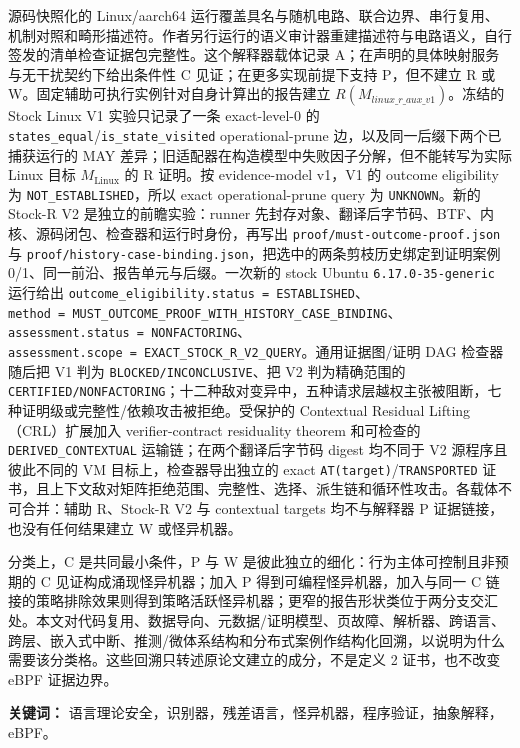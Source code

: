 \documentclass[
  11pt,
  a4paper,
]{ctexart}
\begin{document}
源码快照化的 Linux/aarch64
运行覆盖具名与随机电路、联合边界、串行复用、机制对照和畸形描述符。作者另行运行的语义审计器重建描述符与电路语义，自行签发的清单检查证据包完整性。这个解释器载体记录
A；在声明的具体映射服务与无干扰契约下给出条件性 C
见证；在更多实现前提下支持 P，但不建立 R 或
W。固定辅助可执行实例针对自身计算出的报告建立
\(R(M_{\mathit{linux\_r\_aux\_v1}})\)。冻结的 Stock Linux V1
实验只记录了一条 exact-level-0 的
\texttt{states\_equal}/\texttt{is\_state\_visited} operational-prune
边，以及同一后缀下两个已捕获运行的 MAY
差异；旧适配器在构造模型中失败因子分解，但不能转写为实际 Linux 目标
\(M_{\mathrm{Linux}}\) 的 R 证明。按 evidence-model v1，V1 的 outcome
eligibility 为 \texttt{NOT\_ESTABLISHED}，所以 exact operational-prune
query 为 \texttt{UNKNOWN}。新的 Stock-R V2 是独立的前瞻实验：runner
先封存对象、翻译后字节码、BTF、内核、源码闭包、检查器和运行时身份，再写出
\texttt{proof/must-outcome-proof.json} 与
\texttt{proof/history-case-binding.json}，把选中的两条剪枝历史绑定到证明案例
0/1、同一前沿、报告单元与后缀。一次新的 stock Ubuntu
\texttt{6.17.0-35-generic} 运行给出
\texttt{outcome\_eligibility.status\ =\ ESTABLISHED}、\texttt{method\ =\ MUST\_OUTCOME\_PROOF\_WITH\_HISTORY\_CASE\_BINDING}、\texttt{assessment.status\ =\ NONFACTORING}、\texttt{assessment.scope\ =\ EXACT\_STOCK\_R\_V2\_QUERY}。通用证据图/证明
DAG 检查器随后把 V1 判为 \texttt{BLOCKED/INCONCLUSIVE}、把 V2
判为精确范围的
\texttt{CERTIFIED/NONFACTORING}；十二种敌对变异中，五种请求层越权主张被阻断，七种证明级或完整性/依赖攻击被拒绝。受保护的
Contextual Residual Lifting（CRL）扩展加入 verifier-contract residuality
theorem 和可检查的 \texttt{DERIVED\_CONTEXTUAL}
运输链；在两个翻译后字节码 digest 均不同于 V2 源程序且彼此不同的 VM
目标上，检查器导出独立的 exact \texttt{AT(target)}/\texttt{TRANSPORTED}
证书，且上下文敌对矩阵拒绝范围、完整性、选择、派生链和循环性攻击。各载体不可合并：辅助
R、Stock-R V2 与 contextual targets 均不与解释器 P
证据链接，也没有任何结果建立 W 或怪异机器。

分类上，C 是共同最小条件，P 与 W
是彼此独立的细化：行为主体可控制且非预期的 C 见证构成涌现怪异机器；加入
P 得到可编程怪异机器，加入与同一 C
链接的策略排除效果则得到策略活跃怪异机器；更窄的报告形状类位于两分支交汇处。本文对代码复用、数据导向、元数据/证明模型、页故障、解析器、跨语言、跨层、嵌入式中断、推测/微体系结构和分布式案例作结构化回溯，以说明为什么需要该分类格。这些回溯只转述原论文建立的成分，不是定义
2 证书，也不改变 eBPF 证据边界。

\textbf{关键词：}
语言理论安全，识别器，残差语言，怪异机器，程序验证，抽象解释，eBPF。
\end{document}
